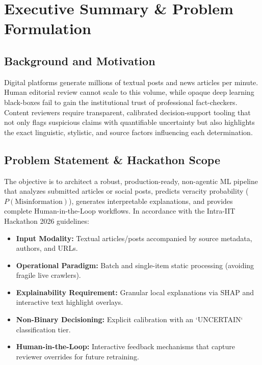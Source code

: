 \documentclass[11pt,a4paper]{article}
\begin{document}
\section{Executive Summary \& Problem Formulation}

\subsection{Background and Motivation}
Digital platforms generate millions of textual posts and news articles per minute. Human editorial review cannot scale to this volume, while opaque deep learning black-boxes fail to gain the institutional trust of professional fact-checkers. Content reviewers require transparent, calibrated decision-support tooling that not only flags suspicious claims with quantifiable uncertainty but also highlights the exact linguistic, stylistic, and source factors influencing each determination.

\subsection{Problem Statement \& Hackathon Scope}
The objective is to architect a robust, production-ready, non-agentic ML pipeline that analyzes submitted articles or social posts, predicts veracity probability ($P(\text{Misinformation})$), generates interpretable explanations, and provides complete Human-in-the-Loop workflows. In accordance with the Intra-IIT Hackathon 2026 guidelines:
\begin{itemize}[noitemsep]
    \item \textbf{Input Modality:} Textual articles/posts accompanied by source metadata, authors, and URLs.
    \item \textbf{Operational Paradigm:} Batch and single-item static processing (avoiding fragile live crawlers).
    \item \textbf{Explainability Requirement:} Granular local explanations via SHAP and interactive text highlight overlays.
    \item \textbf{Non-Binary Decisioning:} Explicit calibration with an `UNCERTAIN` classification tier.
    \item \textbf{Human-in-the-Loop:} Interactive feedback mechanisms that capture reviewer overrides for future retraining.
\end{itemize}
\end{document}
